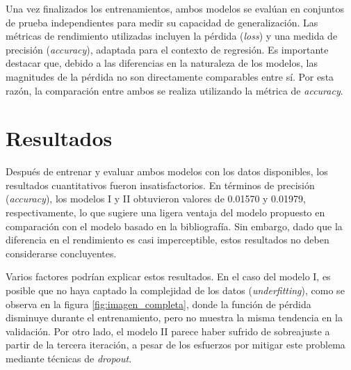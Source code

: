 \documentclass[runningheads]{llncs}
\begin{document}
    Una vez finalizados los entrenamientos, ambos modelos se evalúan en conjuntos de prueba independientes para medir su capacidad de generalización. Las métricas de rendimiento utilizadas incluyen la pérdida (\textit{loss}) y una medida de precisión (\textit{accuracy}), adaptada para el contexto de regresión. Es importante destacar que, debido a las diferencias en la naturaleza de los modelos, las magnitudes de la pérdida no son directamente comparables entre sí. Por esta razón, la comparación entre ambos se realiza utilizando la métrica de \textit{accuracy}.

\section{Resultados}

Después de entrenar y evaluar ambos modelos con los datos disponibles, los resultados cuantitativos fueron insatisfactorios. En términos de precisión (\textit{accuracy}), los modelos I y II obtuvieron valores de 0.01570 y 0.01979, respectivamente, lo que sugiere una ligera ventaja del modelo propuesto en comparación con el modelo basado en la bibliografía. Sin embargo, dado que la diferencia en el rendimiento es casi imperceptible, estos resultados no deben considerarse concluyentes.

Varios factores podrían explicar estos resultados. En el caso del modelo I, es posible que no haya captado la complejidad de los datos (\textit{underfitting}), como se observa en la figura \ref{fig:imagen_completa}, donde la función de pérdida disminuye durante el entrenamiento, pero no muestra la misma tendencia en la validación. Por otro lado, el modelo II parece haber sufrido de sobreajuste a partir de la tercera iteración, a pesar de los esfuerzos por mitigar este problema mediante técnicas de \textit{dropout}.
\end{document}

